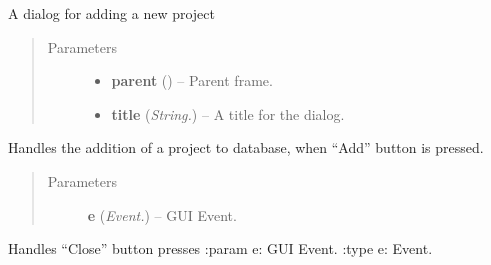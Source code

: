 \documentclass[letterpaper,10pt,english]{sphinxmanual}
\begin{document}
\begin{fulllineitems}
\label{api:wos.AddProjectDialog}
A dialog for adding a new project
\begin{quote}\begin{description}
\item[{Parameters}] \leavevmode\begin{itemize}
\item {} 
\textbf{parent} () -- Parent frame.

\item {} 
\textbf{title} (\emph{String.}) -- A title for the dialog.

\end{itemize}

\end{description}\end{quote}

\begin{fulllineitems}
\label{api:wos.AddProjectDialog.OnAdd}
Handles the addition of a project to database, when
``Add'' button is pressed.
\begin{quote}\begin{description}
\item[{Parameters}] \leavevmode
\textbf{e} (\emph{Event.}) -- GUI Event.

\end{description}\end{quote}

\end{fulllineitems}


\begin{fulllineitems}
\label{api:wos.AddProjectDialog.OnClose}
Handles ``Close'' button presses
:param e: GUI Event.
:type e: Event.

\end{fulllineitems}


\end{fulllineitems}

\end{document}
